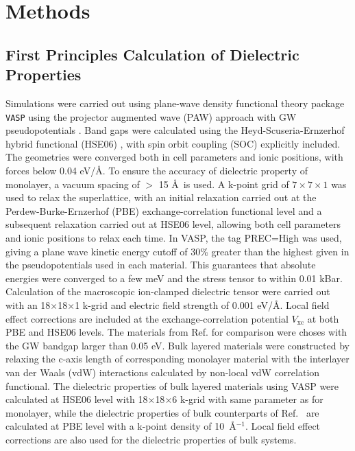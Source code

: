 \section{Methods}
\label{sec:diel-org8457dbb}

\subsection*{First Principles Calculation of Dielectric Properties}
\label{sec:first-princ-calc}

Simulations were carried out using plane-wave density functional
theory package \texttt{VASP}
\cite{Kresse_1993_MD_liquid_metal,Kresse_1996_1,Kresse_1996_2} using
the projector augmented wave (PAW) approach with GW pseudopotentials
\cite{Kresse_1999_pseudopotentials}. Band gaps were calculated using
the Heyd-Scuseria-Ernzerhof hybrid functional (HSE06)
\cite{Heyd_2003_HSe,HSE_2006_erratum}, with spin orbit coupling (SOC) explicitly
included. The geometries were converged both in cell parameters and
ionic positions, with forces below 0.04 eV/\AA. To ensure the accuracy
of dielectric property of monolayer, a vacuum spacing of $>$ 15 \AA~is
used. A k-point grid of \(7\times7\times1\) was used to relax the
superlattice, with an initial relaxation carried out at the
Perdew-Burke-Ernzerhof
(PBE)\cite{Perdew_1996_GGA,Ernzerhof_1999,Paier_2005_PBE}
exchange-correlation functional level and a subsequent relaxation
carried out at HSE06 level, allowing both cell parameters and ionic
positions to relax each time. In VASP, the tag PREC=High was used,
giving a plane wave kinetic energy cutoff of 30\% greater than the
highest given in the pseudopotentials used in each material. This
guarantees that absolute energies were converged to a few meV and the
stress tensor to within 0.01 kBar.  Calculation of the macroscopic
ion-clamped dielectric tensor were carried out with an
18$\times$18$\times$1 k-grid and electric field strength of 0.001
eV/\AA.  Local field effect corrections are included at the
exchange-correlation potential $V_{\mathrm{xc}}$ at both PBE and HSE06
levels. The materials from Ref.\cite{Haastrup_2018_database} for comparison
were choses with the GW bandgap larger than 0.05 eV. Bulk layered
materials were constructed by relaxing the c-axis length of
corresponding monolayer material with the interlayer van der Waals
(vdW) interactions calculated by non-local vdW correlation
functional\cite{Lee_2010_vdFD2}.  The dielectric properties of bulk
layered materials using VASP were calculated at HSE06 level with
18$\times$18$\times$6 k-grid with same parameter as for monolayer,
while the dielectric properties of bulk counterparts of
Ref.~\cite{Haastrup_2018_database} are calculated at PBE level with a k-point
density of 10~\AA$^{-1}$. Local field effect corrections are also used
for the dielectric properties of bulk systems.



